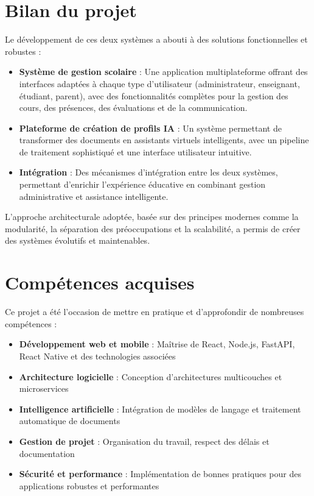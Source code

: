 \documentclass[12pt, a4paper]{report}
\begin{document}
\section{Bilan du projet}

Le développement de ces deux systèmes a abouti à des solutions fonctionnelles et robustes :

\begin{itemize}
  \item \textbf{Système de gestion scolaire} : Une application multiplateforme offrant des interfaces adaptées à chaque type d'utilisateur (administrateur, enseignant, étudiant, parent), avec des fonctionnalités complètes pour la gestion des cours, des présences, des évaluations et de la communication.
  
  \item \textbf{Plateforme de création de profils IA} : Un système permettant de transformer des documents en assistants virtuels intelligents, avec un pipeline de traitement sophistiqué et une interface utilisateur intuitive.
  
  \item \textbf{Intégration} : Des mécanismes d'intégration entre les deux systèmes, permettant d'enrichir l'expérience éducative en combinant gestion administrative et assistance intelligente.
\end{itemize}

L'approche architecturale adoptée, basée sur des principes modernes comme la modularité, la séparation des préoccupations et la scalabilité, a permis de créer des systèmes évolutifs et maintenables.

\section{Compétences acquises}

Ce projet a été l'occasion de mettre en pratique et d'approfondir de nombreuses compétences :

\begin{itemize}
  \item \textbf{Développement web et mobile} : Maîtrise de React, Node.js, FastAPI, React Native et des technologies associées
  
  \item \textbf{Architecture logicielle} : Conception d'architectures multicouches et microservices
  
  \item \textbf{Intelligence artificielle} : Intégration de modèles de langage et traitement automatique de documents
  
  \item \textbf{Gestion de projet} : Organisation du travail, respect des délais et documentation
  
  \item \textbf{Sécurité et performance} : Implémentation de bonnes pratiques pour des applications robustes et performantes
\end{itemize}
\end{document}
